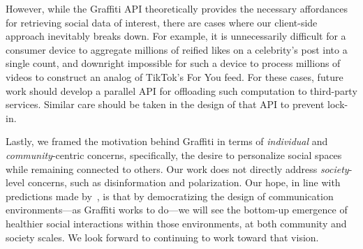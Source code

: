 However, while the Graffiti API theoretically provides the necessary
affordances for retrieving social data of interest,
there are cases where our client-side approach inevitably breaks down.
For example, it is unnecessarily difficult for a consumer device to
aggregate millions of reified likes on a celebrity's post into a single count, and
downright impossible for such a device to
process millions of videos to construct an analog of TikTok's For You feed.
For these cases, future work should develop
a parallel API for offloading such
computation to third-party services.
Similar care should be taken
in the design of that API to prevent lock-in.

Lastly, we framed the motivation behind Graffiti in terms of
\emph{individual} and \emph{community}-centric concerns,
specifically, the desire to personalize social spaces while remaining connected to others.
Our work does not directly address \emph{society}-level concerns,
such as disinformation and polarization.
Our hope, in line with predictions made by~{\cite{threeleggedstool}}, is that by democratizing
the design of communication environments---as Graffiti works to do---we
will see the bottom-up emergence of healthier social interactions within those environments,
at both community and society scales.
We look forward to continuing to work toward that vision.
